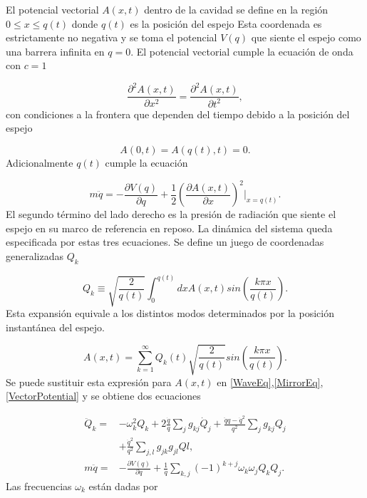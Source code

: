 \documentclass[10pt,a4paper]{report}
\begin{document}
El potencial vectorial $A(x,t)$ dentro de la cavidad se define en la región $0 \leq x \leq q(t)$ donde $q(t)$ es la posición del espejo Esta coordenada es estrictamente no negativa y se toma el potencial $V(q)$ que siente el espejo como una barrera infinita en $q=0$. El potencial vectorial cumple la ecuación de onda con $c=1$

\begin{equation}\label{WaveEq}
\frac{\partial^2 A(x,t)}{\partial x^2} = \frac{\partial^2 A(x,t)}{\partial t^2},
\end{equation} con condiciones a la frontera que dependen del tiempo debido a la posición del espejo

\begin{equation}\label{VectorPotential}
A(0,t) = A(q(t),t) = 0.
\end{equation} Adicionalmente $q(t)$ cumple la ecuación

\begin{equation}\label{MirrorEq}
m\ddot{q} = -\frac{\partial V(q)}{\partial q} + \frac{1}{2}(\frac{\partial A(x,t)}{\partial x})^2 |_{x=q(t)}.
\end{equation} El segundo término del lado derecho es la presión de radiación que siente el espejo en su marco de referencia en reposo. La dinámica del sistema queda especificada por estas tres ecuaciones. Se define un juego de coordenadas generalizadas $Q_k$

\begin{equation} \label{QExpansion}
Q_k \equiv  \sqrt{\frac{2}{q(t)}} \int_0^{q(t)}dx A(x,t)sin(\frac{k\pi x}{q(t)}).
\end{equation} Esta expansión equivale a los distintos modos determinados por la posición instantánea del espejo. 

\begin{equation}
A(x,t) = \sum_{k=1}^\infty Q_k(t) \sqrt{\frac{2}{q(t)}}sin(\frac{k\pi x}{q(t)}).
\end{equation} Se puede sustituir esta expresión para $A(x,t)$ en \eqref{WaveEq},\eqref{MirrorEq}, \eqref{VectorPotential} y se obtiene dos ecuaciones

\begin{align}\label{RegularModesEq}
\ddot{Q}_k =& -\omega^2_k Q_k + 2\frac{\dot{q}}{q} \sum_j g_{kj}\dot{Q}_j +\frac{\ddot{q}q-\dot{q}^2}{q^2} \sum_j g_{kj}Q_j\\
&+ \frac{\dot{q}^2}{q^2}\sum_{j,l} g_{jk}g_{jl}Ql,\nonumber \\
m\ddot{q} =& -\frac{\partial V(q)}{\partial q} + \frac{1}{q}\sum_{k,j}(-1)^{k+j}\omega_k \omega_j Q_k Q_j.
\end{align} Las frecuencias $\omega_k$ están dadas por
\end{document}
